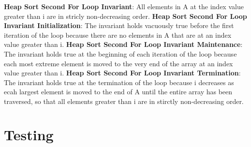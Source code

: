 \documentclass[onecolumn, 12pt, article]{IEEEtran}
\numberwithin{case}{problem}
\numberwithin{condition}{problem}
\numberwithin{condition}{subsection}
\numberwithin{definition}{section}
\theoremstyle{remark}
\numberwithin{question}{problem}
\theoremstyle{plain}
\numberwithin{answer}{problem}
\numberwithin{solution}{section}
\numberwithin{equation}{section}%
\begin{document}
\newline
\newline
\textbf{Heap Sort Second For Loop Invariant}: All elements in A at the index value greater than i are in stricly non-decreasing order.
\newline
\textbf{Heap Sort Second For Loop Invariant Initialization}: The invariant holds vacuously true before the first iteration of the loop because there are no elements in A that are at an index value greater than i.
\newline
\textbf{Heap Sort Second For Loop Invariant Maintenance}: The invariant holds true at the beginning of each iteration of the loop because each most extreme element is moved to the very end of the array at an index value greater than i.
\newline
\textbf{Heap Sort Second For Loop Invariant Termination}: The invariant holds true at the termination of the loop because i decreases as ecah largest element is moved to the end of A until the entire array has been traversed, so that all elements greater than i are in stirctly non-decreasing order.
\newline
\newline

\section{Testing}
\end{document}
